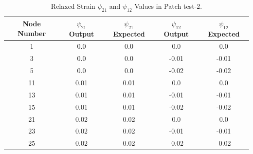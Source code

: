 \documentclass[12pt]{article}
\begin{document}
\begin{table}[H]
	\begin{center}
		\begin{tabular}{||c c c c c||} 
			\hline
			Node Number & $\psi_{21}$ Output & $\psi_{21}$ Expected  & $\psi_{12}$ Output & $\psi_{12}$ Expected \\ [0.8ex] 
			\hline\hline
			1 & 0.0 & 0.0 & 0.0 & 0.0  \\ 
			[0.8ex]
			\hline
			3 & 0.0 & 0.0 & -0.01 & -0.01  \\ 
			[0.8ex]
			\hline
			5 & 0.0 & 0.0 & -0.02 & -0.02   \\ 
			[0.8ex]
			\hline
			11 & 0.01 & 0.01 & 0.0 & 0.0   \\ 
			[0.8ex]
			\hline	
			\rowcolor{lightgray} 13 & 0.01 & 0.01 & -0.01 & -0.01  \\ 
			[0.8ex]
			\hline
			15 & 0.01 & 0.01 & -0.02 & -0.02  \\ 
			[0.8ex]
			\hline
			21 & 0.02 & 0.02 & 0.0 & 0.0  \\ 
			[0.8ex]
			\hline
			23 & 0.02 & 0.02 & -0.01 & -0.01  \\ 
			[0.8ex]
			\hline	
			25 & 0.02 & 0.02 & -0.02 & -0.02   \\ 
			[0.8ex]
			\hline
		\end{tabular}
		\caption{Relaxed Strain $\psi_{21}$ and $\psi_{12}$ Values in Patch test-2.}
	\end{center}
\end{table}
\end{document}
